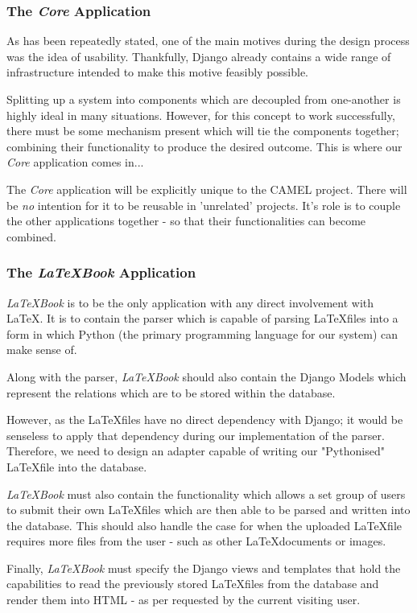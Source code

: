 	\subsubsection{The \textit{Core} Application}
		As has been repeatedly stated, one of the main motives during the design process was the idea of usability. Thankfully, Django already contains a wide range of infrastructure intended to make this motive feasibly possible.
		
		Splitting up a system into components which are decoupled from one-another is highly ideal in many situations. However, for this concept to work successfully, there must be some mechanism present which will tie the components together; combining their functionality to produce the desired outcome. This is where our \textit{Core} application comes in...
		
		The \textit{Core} application will be explicitly unique to the CAMEL project. There will be \emph{no} intention for it to be reusable in 'unrelated' projects. It's role is to couple the other applications together - so that their functionalities can become combined.
	
	\subsubsection{The \textit{\LaTeX Book} Application}
		\textit{\LaTeX Book} is to be the only application with any direct involvement with \LaTeX. It is to contain the parser which is capable of parsing \LaTeX files into a form in which Python (the primary programming language for our system) can make sense of.
		
		Along with the parser, \textit{\LaTeX Book} should also contain the Django Models which represent the relations which are to be stored within the database.
		
		However, as the \LaTeX files have no direct dependency with Django; it would be senseless to apply that dependency during our implementation of the parser. Therefore, we need to design an adapter capable of writing our "Pythonised" \LaTeX file into the database.
		
		\textit{\LaTeX Book} must also contain the functionality which allows a set group of users to submit their own \LaTeX files which are then able to be parsed and written into the database. This should also handle the case for when the uploaded \LaTeX file requires more files from the user - such as other \LaTeX documents or images.
		
		Finally, \textit{\LaTeX Book} must specify the Django views and templates that hold the capabilities to read the previously stored \LaTeX files from the database and render them into HTML - as per requested by the current visiting user.
	
